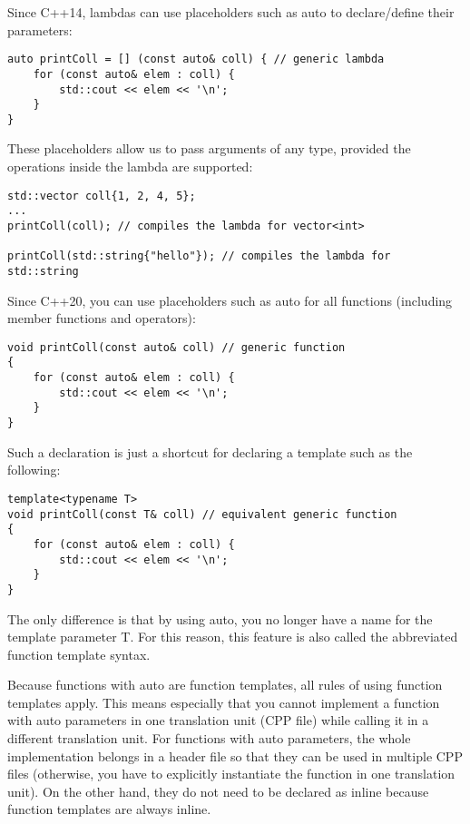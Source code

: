 Since C++14, lambdas can use placeholders such as auto to declare/define their parameters:

\begin{lstlisting}[style=styleCXX]
auto printColl = [] (const auto& coll) { // generic lambda
	for (const auto& elem : coll) {
		std::cout << elem << '\n';
	}
}
\end{lstlisting}

These placeholders allow us to pass arguments of any type, provided the operations inside the lambda are supported:

\begin{lstlisting}[style=styleCXX]
std::vector coll{1, 2, 4, 5};
...
printColl(coll); // compiles the lambda for vector<int>

printColl(std::string{"hello"}); // compiles the lambda for std::string
\end{lstlisting}

Since C++20, you can use placeholders such as auto for all functions (including member functions and operators):

\begin{lstlisting}[style=styleCXX]
void printColl(const auto& coll) // generic function
{
	for (const auto& elem : coll) {
		std::cout << elem << '\n';
	}
}
\end{lstlisting}

Such a declaration is just a shortcut for declaring a template such as the following:

\begin{lstlisting}[style=styleCXX]
template<typename T>
void printColl(const T& coll) // equivalent generic function
{
	for (const auto& elem : coll) {
		std::cout << elem << '\n';
	}
}
\end{lstlisting}

The only difference is that by using auto, you no longer have a name for the template parameter T. For this reason, this feature is also called the abbreviated function template syntax.

Because functions with auto are function templates, all rules of using function templates apply. This means especially that you cannot implement a function with auto parameters in one translation unit (CPP file) while calling it in a different translation unit. For functions with auto parameters, the whole implementation belongs in a header file so that they can be used in multiple CPP files (otherwise, you have to explicitly instantiate the function in one translation unit). On the other hand, they do not need to be declared as inline because function templates are always inline.

